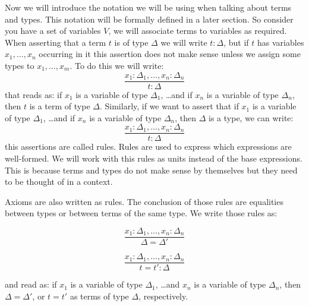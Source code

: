 Now we will introduce the notation we will be using when talking 
about terms and types. {\color{orange} This notation will be formally defined
in a later section.} So consider you have a set of variables $V$,
we will associate terms to variables as required.
When asserting that a term $t$ is of type $\Delta$ we will write
$t : \Delta$, but if $t$ has variables $x_1, \dots, x_n$ occurring in it this assertion
does not make sense unless we assign some types to $x_1, \dots, x_m$.
To do this we will write:
\begin{equation*}
    \dfrac{
        x_1 : \Delta_1, \dots, x_n: \Delta_n
    }{
        t : \Delta
    }
\end{equation*}
that reads as: if $x_1$ is a variable of type $\Delta_1$, \dots and if $x_n$ is a variable of type $\Delta_n$,
then $t$ is a term of type $\Delta$. 
Similarly, if we want to assert that if $x_1$ is a variable of type $\Delta_1$,
\dots and if $x_n$ is a variable of type $\Delta_n$,
then $\Delta$ is a type, we can write:
\begin{equation*}
    \dfrac{
        x_1 : \Delta_1, \dots, x_n : \Delta_n 
    }{
        t : \Delta
    }
\end{equation*}
this assertions are called rules.
Rules are used to express which expressions are well-formed.
We will work with this rules as units instead of the base expressions.
This is because terms and types do not make sense by themselves
but they need to be thought of in a context. 

Axioms are also written as rules. The conclusion of those rules
are equalities between types or between terms of the same type.
We write those rules as:
\begin{minipage}{0.5\textwidth}
  \begin{equation*}
    \dfrac{
        x_1 : \Delta_1, \dots, x_n : \Delta_n
    }{
        \Delta = \Delta'
    }
  \end{equation*}
\end{minipage}%
\begin{minipage}{0.5\textwidth}
  \begin{equation*}
    \dfrac{
        x_1 : \Delta_1, \dots, x_n : \Delta_n
    }{
        t = t' : \Delta
    }
  \end{equation*}
\end{minipage}
and read as: if $x_1$ is a variable of type $\Delta_1$, \dots and $x_n$ is a variable of type $\Delta_n$,
then $\Delta = \Delta'$, or $t = t'$ as terms of type $\Delta$, respectively.

